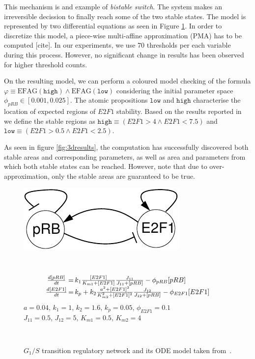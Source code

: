 \documentclass[12pt,oneside,draft]{fithesis2}
\newcommand{\ef}[1]{\ensuremath{\mbox{EF} #1}}
\newcommand{\ag}[1]{\ensuremath{\mbox{AG} #1}}
\begin{document}
				This mechanism is and example of \emph{bistable switch}. The system makes an irreversible decission to finally reach some of the two stable states. The model is represented by two differential equations as seen in Figure \ref{fig:genmodel}. In order to discretize this model, a piece-wise multi-affine approximation (PMA) has to be computed [cite]. In our experiments, we use 70 thresholds per each variable during this process. However, no significant change in results has been observed for higher threshold counts.
				
				On the resulting model, we can perform a coloured model checking of the formula $\varphi \equiv \ef{\ag{(\mathtt{high})}}\wedge \ef{\ag{(\mathtt{low})}}$ considering the initial parameter space ${\phi_{pRB}\in[0.001,0.025]}$. The atomic propositions  $\mathtt{low}$ and $\mathtt{high}$ characterise the location of expected regions of $E2F1$ stability. Based on the results reported in~\cite{SKH04} we define the stable regions as $\mathtt{high}\equiv (E2F1>4 \wedge E2F1<7.5)$ and $\mathtt{low}\equiv ({E2F1>0.5} \wedge E2F1<2.5)$.
				
				As seen in figure \ref{fig:3dresults}, the computation has successfully discovered both stable areas and corresponding parameters, as well as area and parameters from which both stable states can be reached. However, note that due to over-approximation, only the stable areas are guaranteed to be true. 
				

\begin{figure}
  \begin{center}
       \vspace*{-6mm}
  \hspace*{-1cm}  \parbox{3.8cm}{\includegraphics[scale=.7]{gs1net.pdf}}~
\parbox{6.5cm}{
\scriptsize
$$\begin{array}{c@{$\,=\,$}l}
\frac{d[pRB]}{dt} & k_1 \frac{[E2F1]}{K_{m1}+[E2F1]}\frac{J_{11}}{J_{11}+[pRB]}  - \phi_{pRB}[pRB]\\[1mm]
\frac{d[E2F1]}{dt} & k_p + k_2 \frac{a^2+[E2F1]^2}{K_{m2}^2+[E2F1]^2}\frac{J_{12}}{J_{12}+[pRB]} - \phi_{E2F1} [E2F1]
\end{array}$$
$a = 0.04$, $k_1=1$, $k_2=1.6$, $k_p=0.05$, $\phi_{E2F1}=0.1$ \\ $J_{11}=0.5$, $J_{12}=5$, $K_{m1}=0.5$, $K_{m2}=4$
}\\
    \end{center}
\caption{$G_1/S$ transition regulatory network and its ODE model taken from~\cite{SKH04}.}
\label{fig:genmodel}
\end{figure}
\end{document}
